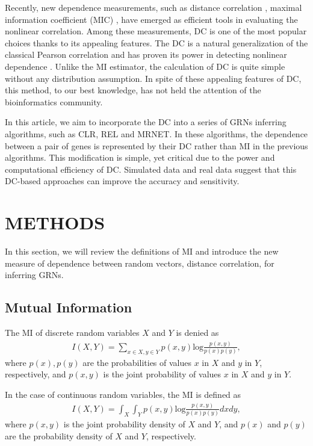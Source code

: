 \documentclass{bioinfo}
\begin{document}
Recently, new dependence measurements, such as distance correlation
\citep{szekely2007measuring}, maximal information coefficient (MIC)
\citep{reshef2011detecting}, have emerged as efficient tools in
evaluating the nonlinear correlation. Among these measurements, DC
is one of the most popular choices thanks to its appealing features.
The DC is a natural generalization of the classical Pearson
correlation and has proven its power in detecting nonlinear
dependence \citep{gorfine2012comment,szekely2007measuring}. Unlike
the MI estimator, the calculation of DC is quite simple without any
distribution assumption.  In spite of  these appealing features of
DC, this method, to our best knowledge, has not held the attention
of the bioinformatics community.

In this article, we aim to incorporate the DC into a series of GRNs
inferring algorithms, such as CLR, REL and MRNET. In these
algorithms, the dependence between a pair of genes is represented by
their DC rather than MI in the previous algorithms. This
modification is simple, yet critical due to the power and
computational efficiency of DC. Simulated data and real data suggest
that this DC-based approaches can improve the accuracy and
sensitivity.

\section{METHODS}
In this section, we will review the definitions of MI and introduce
the new measure of dependence between random vectors, distance
correlation, for inferring GRNs.
\subsection{Mutual Information}
The MI of discrete random variables $X$ and $Y$ is denied as
\begin{align*}
    I(X,Y)=\sum_{x\in X,y\in Y} p(x,y)\mbox{log}\frac{p(x,y)}{p(x)p(y)},
\end{align*}
where $p(x),p(y)$ are the probabilities of values $x$ in $X$ and $y$
in $Y$, respectively, and $p(x,y)$ is the joint probability of
values $x$ in $X$ and $y$ in $Y$.

In the case of continuous random variables, the MI is defined as
\begin{align*}
    I(X,Y)=\int_X\int_Y p(x,y)\mbox{log}\frac{p(x,y)}{p(x)p(y)}dxdy,
\end{align*}
where $p(x,y)$ is the joint probability density of $X$ and $Y$, and $p(x)$ and $p(y)$ are the probability density of $X$ and $Y$, respectively.
\end{document}
